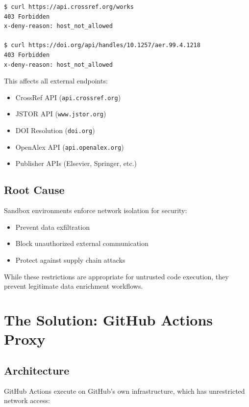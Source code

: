 \begin{verbatim}
$ curl https://api.crossref.org/works
403 Forbidden
x-deny-reason: host_not_allowed

$ curl https://doi.org/api/handles/10.1257/aer.99.4.1218
403 Forbidden
x-deny-reason: host_not_allowed
\end{verbatim}

This affects all external endpoints:
\begin{itemize}
    \item CrossRef API (\texttt{api.crossref.org})
    \item JSTOR API (\texttt{www.jstor.org})
    \item DOI Resolution (\texttt{doi.org})
    \item OpenAlex API (\texttt{api.openalex.org})
    \item Publisher APIs (Elsevier, Springer, etc.)
\end{itemize}

\subsection{Root Cause}

Sandbox environments enforce network isolation for security:
\begin{itemize}
    \item Prevent data exfiltration
    \item Block unauthorized external communication
    \item Protect against supply chain attacks
\end{itemize}

While these restrictions are appropriate for untrusted code execution, they prevent legitimate data enrichment workflows.

\section{The Solution: GitHub Actions Proxy}
\label{sec:api-solution}

\subsection{Architecture}

GitHub Actions execute on GitHub's own infrastructure, which has unrestricted network access:


